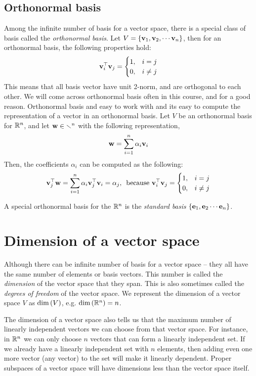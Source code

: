 \subsection{Orthonormal basis}
Among the infinite number of basis for a vector space, there is a special class of basis called the \textit{orthonormal basis}. Let $V = \left\{ \mathbf{v}_1, \mathbf{v}_2, \cdots \mathbf{v}_n\right\}$, then for an orthonormal basis, the following properties hold:
\begin{equation}
    \mathbf{v}_i^\top\mathbf{v}_j = \begin{cases} 1, & i = j \\ 0, & i \neq j \end{cases}
\end{equation}
This means that all basis vector have unit 2-norm, and are orthogonal to each other. We will come across orthonormal basis often in this course, and for a good reason. Orthonormal basis and easy to work with and its easy to compute the representation of a vector in an orthonormal basis. Let $V$ be an orthonormal basis for $\mathbb{R}^n$, and let $\mathbf{w} \in \mathbb{r}^n$ with the following representation,
\[ \mathbf{w} = \sum_{i=1}^n \alpha_i \mathbf{v}_i \]
Then, the coefficients $\alpha_i$ can be computed as the following:
\[ \mathbf{v}_j^\top\mathbf{w} =  \sum_{i=1}^n \alpha_i \mathbf{v}_j^\top\mathbf{v}_i = \alpha_j, \,\,\, \text{because } \mathbf{v}_i^\top\mathbf{v}_j = \begin{cases} 1, & i = j \\ 0, & i \neq j \end{cases} \]

A special orthonormal basis for the $\mathbb{R}^n$ is the \textit{standard basis} $\left\{ \mathbf{e}_1, \mathbf{e}_2 \cdots \mathbf{e}_n\right\}$.

\section{Dimension of a vector space}
Although there can be infinite number of basis for a vector space -- they all have the same number of elements or basis vectors. This number is called the \textit{dimension} of the vector space that they span. This is also sometimes called the 
\textit{degrees of freedom} of the vector space. We represent the dimension of a vector space $V$ as $\text{dim}\left( V\right)$, e.g. $\text{dim}\left( \mathbb{R}^n\right) = n$.

The dimension of a vector space also tells us that the maximum number of linearly independent vectors we can choose from that vector space. For instance, in $\mathbb{R}^n$ we can only choose $n$ vectors that can form a linearly independent set. If we already have a linearly independent set with $n$ elements, then adding even one more vector (any vector) to the set will make it linearly dependent. Proper subspaces of a vector space will have dimensions less than the vector space itself.

